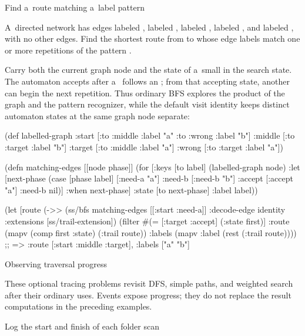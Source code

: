 {{{\secc Find a~route matching a~label pattern

 A~directed network has edges
 labeled ,
 labeled ,
 labeled ,
 labeled , and
 labeled , with no other edges. Find the
shortest route from  to  whose edge labels match
one or more repetitions of the pattern .

\smallskip
{} Carry both the current graph node and the state
of a~small
in the search state. The automaton accepts after
a~ follows an ; from that accepting state, another 
can begin the next repetition. Thus ordinary BFS explores the product of the
graph and the pattern recognizer, while the default visit identity keeps
distinct automaton states at the same graph node separate:

\begtt {}
(def labelled-graph
  {:start [{:to :middle :label "a"}
           {:to :wrong :label "b"}]
   :middle [{:to :target :label "b"}]
   :target [{:to :middle :label "a"}]
   :wrong [{:to :target :label "a"}]})

(defn matching-edges [[node phase]]
  (for [{:keys [to label]} (labelled-graph node)
        :let [next-phase
              (case [phase label]
                [:need-a "a"] :need-b
                [:need-b "b"] :accept
                [:accept "a"] :need-b
                nil)]
        :when next-phase]
    {:state [to next-phase] :label label}))

(let [route (->> (ss/bfs matching-edges [[:start :need-a]]
                             {:decode-edge identity
                              :extensions [ss/trail-extension]})
                (filter #(= [:target :accept] (:state %
                first)]
  {:route (mapv (comp first :state) (:trail route))
   :labels (mapv :label (rest (:trail route)))})
;; => {:route [:start :middle :target], :labels ["a" "b"]}
\endtt

\sec Observing traversal progress

These optional tracing problems revisit DFS, simple paths, and weighted
search after their ordinary uses. Events expose progress; they do not
replace the result computations in the preceding examples.

\secc Log the start and finish of each folder scan

}}}
